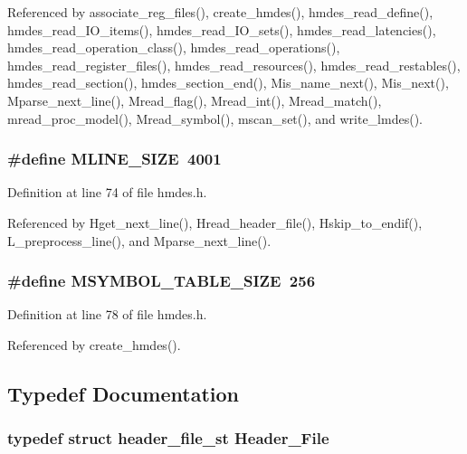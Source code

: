 Referenced by associate\_\-reg\_\-files(), create\_\-hmdes(), hmdes\_\-read\_\-define(), hmdes\_\-read\_\-IO\_\-items(), hmdes\_\-read\_\-IO\_\-sets(), hmdes\_\-read\_\-latencies(), hmdes\_\-read\_\-operation\_\-class(), hmdes\_\-read\_\-operations(), hmdes\_\-read\_\-register\_\-files(), hmdes\_\-read\_\-resources(), hmdes\_\-read\_\-restables(), hmdes\_\-read\_\-section(), hmdes\_\-section\_\-end(), Mis\_\-name\_\-next(), Mis\_\-next(), Mparse\_\-next\_\-line(), Mread\_\-flag(), Mread\_\-int(), Mread\_\-match(), mread\_\-proc\_\-model(), Mread\_\-symbol(), mscan\_\-set(), and write\_\-lmdes().
\subsubsection{\setlength{\rightskip}{0pt plus 5cm}\#define MLINE\_\-SIZE~4001}\label{hmdes_8h_4253cac11fcc1fba152b18205cc28a91}




Definition at line 74 of file hmdes.h.

Referenced by Hget\_\-next\_\-line(), Hread\_\-header\_\-file(), Hskip\_\-to\_\-endif(), L\_\-preprocess\_\-line(), and Mparse\_\-next\_\-line().
\subsubsection{\setlength{\rightskip}{0pt plus 5cm}\#define MSYMBOL\_\-TABLE\_\-SIZE~256}\label{hmdes_8h_527d6f7ae08e4300987d486fe6736f29}




Definition at line 78 of file hmdes.h.

Referenced by create\_\-hmdes().

\subsection{Typedef Documentation}
\subsubsection{\setlength{\rightskip}{0pt plus 5cm}typedef struct \bf{header\_\-file\_\-st}
 \bf{Header\_\-File}}\label{hmdes_8h_36de1b6403148ee277b3472e18e5ab88}


